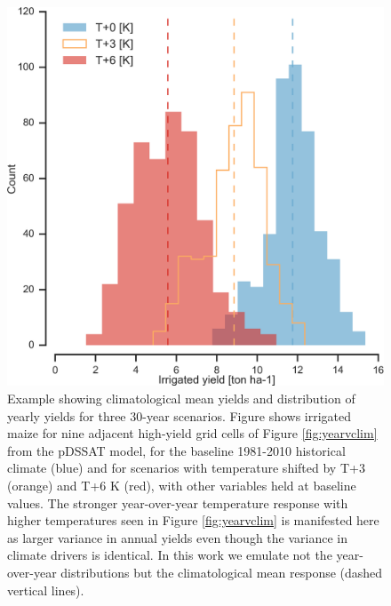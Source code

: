 \documentclass[preprint, 5p, times, twocolumn]{elsarticle}
\begin{document}
\begin{figure}[th!]
\centering
   \includegraphics[width=0.95\linewidth]{figures/hist_year.png}
   \caption{Example showing climatological mean yields and distribution of yearly yields for three 30-year scenarios. Figure shows irrigated maize for nine adjacent high-yield grid cells of Figure \ref{fig:yearvclim} from the pDSSAT model, for the baseline 1981-2010 historical climate (blue) and for scenarios with temperature shifted by T+3 (orange) and T+6 K (red), with other variables held at baseline values. The stronger year-over-year temperature response with higher temperatures seen in Figure \ref{fig:yearvclim} is manifested here as larger variance in annual yields even though the variance in climate drivers is identical. In this work we emulate not the year-over-year distributions but the climatological mean response (dashed vertical lines).}
   \label{fig:yearly}
\end{figure}
\end{document}

